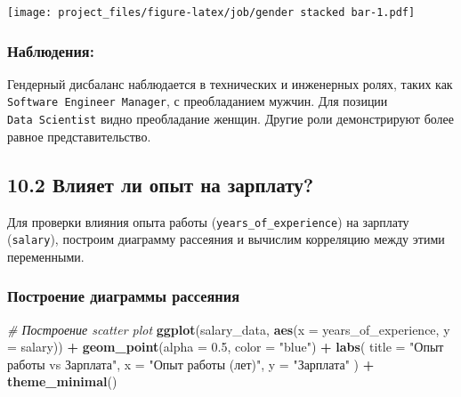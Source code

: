 \documentclass[
]{article}
\newenvironment{Shaded}{\begin{snugshade}}{\end{snugshade}}
\newcommand{\AttributeTok}[1]{\textcolor[rgb]{0.13,0.29,0.53}{#1}}
\newcommand{\CommentTok}[1]{\textcolor[rgb]{0.56,0.35,0.01}{\textit{#1}}}
\newcommand{\FloatTok}[1]{\textcolor[rgb]{0.00,0.00,0.81}{#1}}
\newcommand{\FunctionTok}[1]{\textcolor[rgb]{0.13,0.29,0.53}{\textbf{#1}}}
\newcommand{\NormalTok}[1]{#1}
\newcommand{\SpecialCharTok}[1]{\textcolor[rgb]{0.81,0.36,0.00}{\textbf{#1}}}
\newcommand{\StringTok}[1]{\textcolor[rgb]{0.31,0.60,0.02}{#1}}
\begin{document}
\texttt{[image: project\_files/figure-latex/job/gender stacked bar-1.pdf]}

\subsubsection{Наблюдения:}\label{ux43dux430ux431ux43bux44eux434ux435ux43dux438ux44f-9}

Гендерный дисбаланс наблюдается в технических и инженерных ролях, таких
как \texttt{Software\ Engineer\ Manager}, с преобладанием мужчин. Для
позиции \texttt{Data\ Scientist} видно преобладание женщин. Другие роли
демонстрируют более равное представительство.

\subsection{10.2 Влияет ли опыт на
зарплату?}\label{ux432ux43bux438ux44fux435ux442-ux43bux438-ux43eux43fux44bux442-ux43dux430-ux437ux430ux440ux43fux43bux430ux442ux443}

Для проверки влияния опыта работы (\texttt{years\_of\_experience}) на
зарплату (\texttt{salary}), построим диаграмму рассеяния и вычислим
корреляцию между этими переменными.

\subsubsection{Построение диаграммы
рассеяния}\label{ux43fux43eux441ux442ux440ux43eux435ux43dux438ux435-ux434ux438ux430ux433ux440ux430ux43cux43cux44b-ux440ux430ux441ux441ux435ux44fux43dux438ux44f}

\begin{Shaded}
\begin{Highlighting}[]
\CommentTok{\# Построение scatter plot}
\FunctionTok{ggplot}\NormalTok{(salary\_data, }\FunctionTok{aes}\NormalTok{(}\AttributeTok{x =}\NormalTok{ years\_of\_experience, }\AttributeTok{y =}\NormalTok{ salary)) }\SpecialCharTok{+}
  \FunctionTok{geom\_point}\NormalTok{(}\AttributeTok{alpha =} \FloatTok{0.5}\NormalTok{, }\AttributeTok{color =} \StringTok{"blue"}\NormalTok{) }\SpecialCharTok{+}
  \FunctionTok{labs}\NormalTok{(}
    \AttributeTok{title =} \StringTok{"Опыт работы vs Зарплата"}\NormalTok{,}
    \AttributeTok{x =} \StringTok{"Опыт работы (лет)"}\NormalTok{,}
    \AttributeTok{y =} \StringTok{"Зарплата"}
\NormalTok{  ) }\SpecialCharTok{+}
  \FunctionTok{theme\_minimal}\NormalTok{()}
\end{Highlighting}
\end{Shaded}
\end{document}
